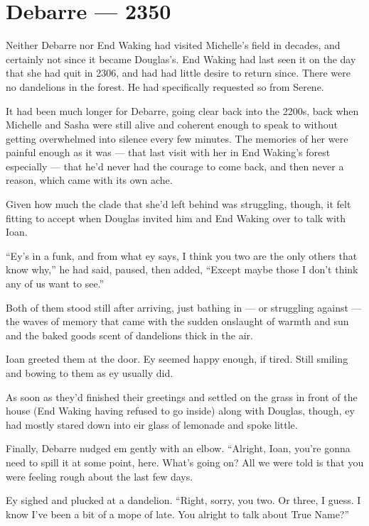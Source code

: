 \hypertarget{debarre-2350}{%
\chapter{Debarre — 2350}\label{debarre-2350}}

Neither Debarre nor End Waking had visited Michelle's field in decades, and certainly not since it became Douglas's. End Waking had last seen it on the day that she had quit in 2306, and had had little desire to return since. There were no dandelions in the forest. He had specifically requested so from Serene.

It had been much longer for Debarre, going clear back into the 2200s, back when Michelle and Sasha were still alive and coherent enough to speak to without getting overwhelmed into silence every few minutes. The memories of her were painful enough as it was — that last visit with her in End Waking's forest especially — that he'd never had the courage to come back, and then never a reason, which came with its own ache.

Given how much the clade that she'd left behind was struggling, though, it felt fitting to accept when Douglas invited him and End Waking over to talk with Ioan.

``Ey's in a funk, and from what ey says, I think you two are the only others that know why,'' he had said, paused, then added, ``Except maybe those I don't think any of us want to see.''

Both of them stood still after arriving, just bathing in — or struggling against — the waves of memory that came with the sudden onslaught of warmth and sun and the baked goods scent of dandelions thick in the air.

Ioan greeted them at the door. Ey seemed happy enough, if tired. Still smiling and bowing to them as ey usually did.

As soon as they'd finished their greetings and settled on the grass in front of the house (End Waking having refused to go inside) along with Douglas, though, ey had mostly stared down into eir glass of lemonade and spoke little.

Finally, Debarre nudged em gently with an elbow. ``Alright, Ioan, you're gonna need to spill it at some point, here. What's going on? All we were told is that you were feeling rough about the last few days.

Ey sighed and plucked at a dandelion. ``Right, sorry, you two. Or three, I guess. I know I've been a bit of a mope of late. You alright to talk about True Name?''

